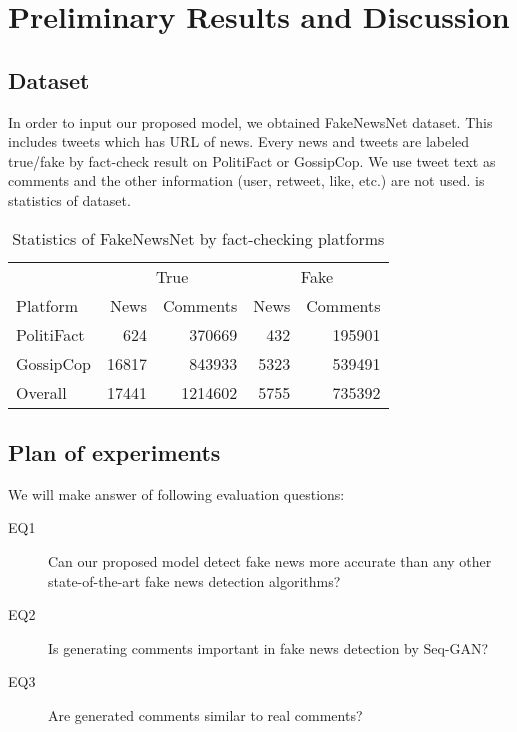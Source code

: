 \section{Preliminary Results and Discussion}
\subsection{Dataset}
In order to input our proposed model, we obtained FakeNewsNet\cite{shu2017exploiting,Shu:2017:FND:3137597.3137600,shu2018fakenewsnet} dataset.
This includes tweets which has URL of news.
Every news and tweets are labeled true/fake by fact-check result on PolitiFact or GossipCop.
We use tweet text as comments and the other information (user, retweet, like, etc.) are not used.
 is statistics of dataset.

\begin{table}[htp]
    \centering
    \caption{Statistics of FakeNewsNet by fact-checking platforms}
    \label{table:fakenewsnet}
    \begin{tabular}{lrrrr}
        \hline 
        & \multicolumn{2}{c}{True} & \multicolumn{2}{c}{Fake} \\
        Platform & News & Comments & News & Comments \\
        \hline \hline 
        PolitiFact & 624 & 370669 & 432 & 195901 \\
        GossipCop & 16817 & 843933 & 5323 & 539491 \\
        \hline 
        Overall & 17441 & 1214602 & 5755 & 735392 \\
        \hline 
    \end{tabular}
\end{table}

\subsection{Plan of experiments}
We will make answer of following evaluation questions:
\begin{description}
    \item[EQ1] Can our proposed model detect fake news more accurate than any other state-of-the-art fake news detection algorithms?
    \item[EQ2] Is generating comments important in fake news detection by Seq-GAN?
    \item[EQ3] Are generated comments similar to real comments?
\end{description}

